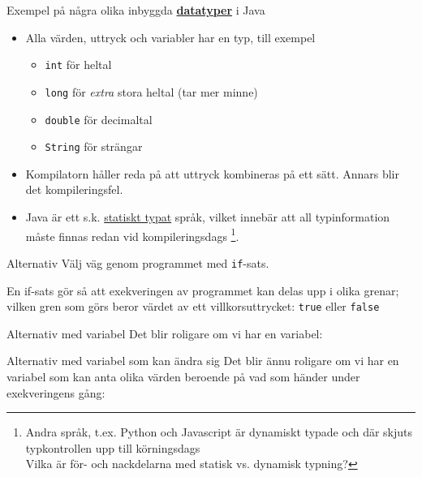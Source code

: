 \documentclass{lecturenotes}
\begin{document}
\begin{Slide}{Exempel på några olika inbyggda \href{https://sv.wikipedia.org/wiki/Datatyp}{\textbf{datatyper}} i Java}
\begin{itemize}
\item Alla värden, uttryck och variabler har en typ, till exempel 
\begin{itemize}\footnotesize
\item \lstinline{int} för heltal 
\item \lstinline{long} för \textit{extra} stora heltal (tar mer minne)
\item \lstinline{double} för decimaltal
\item \lstinline{String} för strängar
\end{itemize}
\item Kompilatorn håller reda på att uttryck kombineras på ett  sätt. Annars blir det kompileringsfel.
\item Java är ett s.k. \href{https://sv.wikipedia.org/wiki/Typsystem}{statiskt typat} språk, vilket innebär att all typinformation måste finnas redan vid kompileringsdags \footnote{Andra språk, t.ex. Python och Javascript är dynamiskt typade och där skjuts typkontrollen upp till körningsdags  \\ Vilka är för- och nackdelarna med statisk vs. dynamisk typning?}. 
\end{itemize}
\end{Slide}

\begin{Slide}{Alternativ}
\footnotesize
Välj väg genom programmet med \lstinline{if}-sats.

En if-sats gör så att exekveringen av programmet kan delas upp i olika grenar; vilken gren som görs beror värdet av ett villkorsuttrycket: \lstinline{true} eller \lstinline{false}   
\end{Slide}

\begin{Slide}{Alternativ med variabel}
\footnotesize
Det blir roligare om vi har en variabel:

\end{Slide}

\begin{Slide}{Alternativ med variabel som kan ändra sig}
\footnotesize
Det blir ännu roligare om vi har en variabel som kan anta olika värden beroende på vad som händer under exekveringens gång:

\end{Slide}
\end{document}
